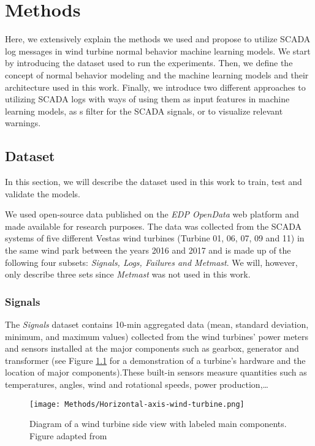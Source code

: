 \chapter{Methods}
\label{chap:methods}
Here, we extensively explain the methods we used and propose to utilize SCADA log messages in wind turbine normal behavior machine learning models.
We start by introducing the dataset used to run the experiments.
Then, we define the concept of normal behavior modeling and the machine learning models and their architecture used in this work.
Finally, we introduce two different approaches to utilizing SCADA logs with ways of using them as input features in machine learning models, as s filter for the SCADA signals,
or to visualize relevant warnings.

\section{Dataset}
In this section, we will describe the dataset used in this work to train, test and validate the models. 
\par We used open-source data published on the \emph{EDP OpenData} web platform \cite{EDP} and made available for research purposes. 
The data was collected from the SCADA systems of five different Vestas wind turbines (Turbine 01, 06, 07, 09 and 11) in the same wind park between the years 2016 and 2017 
and is made up of the following four subsets: \emph{Signals, Logs, Failures and Metmast}. We will, however, only describe three sets since \emph{Metmast} was not used in this work.

\subsection{Signals}
 The \emph{Signals} dataset contains 10-min aggregated data (mean, standard deviation, minimum, and maximum values) collected from the wind turbines' power meters and
 sensors installed at the major components such as gearbox, generator and transformer (see Figure \ref{fig:WTG_Diagram} for a 
 demonstration of a turbine's hardware and the location of major components).These built-in sensors measure quantities such as temperatures, angles, wind and rotational speeds, 
 power production,\dots

 \begin{figure}[H]
  \begin{center}
    \texttt{[image: Methods/Horizontal-axis-wind-turbine.png]}
  \end{center}
  \caption{Diagram of a wind turbine side view with labeled main components. Figure adapted from \cite{WTG_Diagram}}
  \label{fig:WTG_Diagram}
\end{figure}

